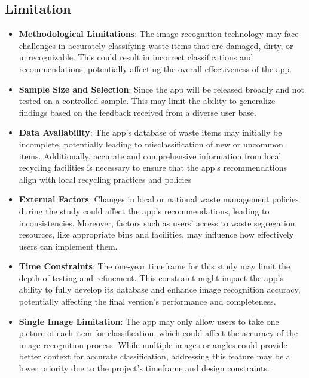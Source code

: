 \subsection{Limitation}
\begin{itemize}
	\item \textbf{Methodological Limitations}: The image recognition technology may face challenges in accurately classifying waste items that are damaged, dirty, or unrecognizable. This could result in incorrect classifications and recommendations, potentially affecting the overall effectiveness of the app.
	
	\item \textbf{Sample Size and Selection}: Since the app will be released broadly and not tested on a controlled sample. This may limit the ability to generalize findings based on the feedback received from a diverse user base.
	
	\item \textbf{Data Availability}: The app’s database of waste items may initially be incomplete, potentially leading to misclassification of new or uncommon items. Additionally, accurate and comprehensive information from local recycling facilities is necessary to ensure that the app’s recommendations align with local recycling practices and policies
	
	\item \textbf{External Factors}: Changes in local or national waste management policies during the study could affect the app’s recommendations, leading to inconsistencies. Moreover, factors such as users' access to waste segregation resources, like appropriate bins and facilities, may influence how effectively users can implement them.
	
	\item \textbf{Time Constraints}: The one-year timeframe for this study may limit the depth of testing and refinement. This constraint might impact the app’s ability to fully develop its database and enhance image recognition accuracy, potentially affecting the final version’s performance and completeness.
	
	\item \textbf{Single Image Limitation}: The app may only allow users to take one picture of each item for classification, which could affect the accuracy of the image recognition process. While multiple images or angles could provide better context for accurate classification, addressing this feature may be a lower priority due to the project's timeframe and design constraints.
\end{itemize}